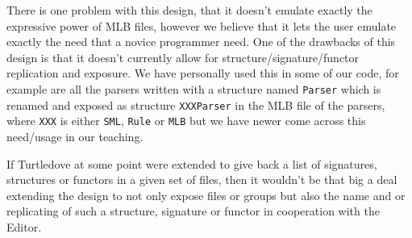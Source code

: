 There is one problem with this design, that it doesn't emulate exactly the
expressive power of MLB files, however we believe that it lets the user emulate
exactly the need that a novice programmer need. One of the drawbacks of this
design is that it doesn't currently allow for structure/signature/functor
replication and exposure. We have personally used this in some of our code, for
example are all the parsers written with a structure named \texttt{Parser} which
is renamed and exposed as structure \texttt{XXXParser} in the MLB file of the
parsers, where \texttt{XXX} is either \texttt{SML}, \texttt{Rule} or
\texttt{MLB} but we have newer come across this need/usage in our teaching.

If Turtledove at some point were extended to give back a list of
signatures, structures or functors in a given set of files, then it wouldn't be
that big a deal extending the design to not only expose files or groups but also
the name and or replicating of such a structure, signature or functor in
cooperation with the Editor.



